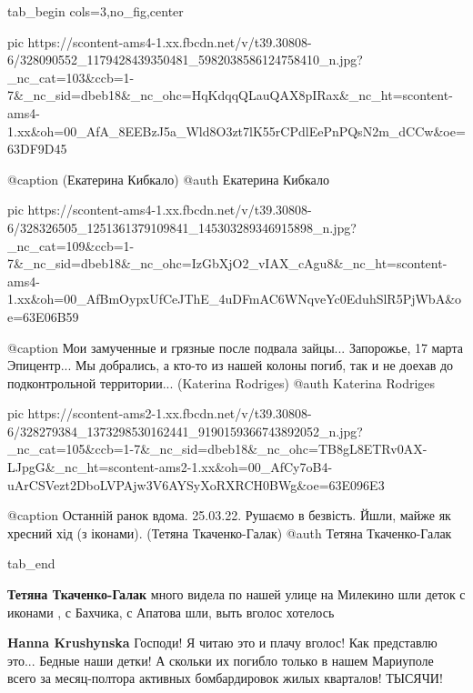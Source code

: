  
 
 
 
 

\ifcmt
  tab_begin cols=3,no_fig,center

     pic https://scontent-ams4-1.xx.fbcdn.net/v/t39.30808-6/328090552_1179428439350481_5982038586124758410_n.jpg?_nc_cat=103&ccb=1-7&_nc_sid=dbeb18&_nc_ohc=HqKdqqQLauQAX8pIRax&_nc_ht=scontent-ams4-1.xx&oh=00_AfA_8EEBzJ5a_Wld8O3zt7lK55rCPdlEePnPQsN2m_dCCw&oe=63DF9D45

     @caption (Екатерина Кибкало)
     @auth Екатерина Кибкало

     pic https://scontent-ams4-1.xx.fbcdn.net/v/t39.30808-6/328326505_1251361379109841_145303289346915898_n.jpg?_nc_cat=109&ccb=1-7&_nc_sid=dbeb18&_nc_ohc=IzGbXjO2_vIAX_cAgu8&_nc_ht=scontent-ams4-1.xx&oh=00_AfBmOypxUfCeJThE_4uDFmAC6WNqveYc0EduhSlR5PjWbA&oe=63E06B59

     @caption Мои замученные и грязные после подвала зайцы... Запорожье, 17 марта Эпицентр... Мы добрались, а кто-то из нашей колоны погиб, так и не доехав до подконтрольной территории... (Katerina Rodriges)
     @auth Katerina Rodriges

     pic https://scontent-ams2-1.xx.fbcdn.net/v/t39.30808-6/328279384_1373298530162441_9190159366743892052_n.jpg?_nc_cat=105&ccb=1-7&_nc_sid=dbeb18&_nc_ohc=TB8gL8ETRv0AX-LJpgG&_nc_ht=scontent-ams2-1.xx&oh=00_AfCy7oB4-uArCSVezt2DboLVPAjw3V6AYSyXoRXRCH0BWg&oe=63E096E3

     @caption Останній ранок вдома. 25.03.22. Рушаємо в безвість. Йшли, майже як хресний хід (з іконами). (Тетяна Ткаченко-Галак)
     @auth Тетяна Ткаченко-Галак

  tab_end
\fi

\textbf{Тетяна Ткаченко-Галак} много видела по нашей улице на Милекино шли деток с иконами , с Бахчика, с Апатова шли, выть вголос хотелось

\textbf{Hanna Krushynska} Господи! Я читаю это и плачу вголос! Как представлю это... Бедные наши детки! А скольки их погибло только в нашем Мариуполе всего за месяц-полтора активных бомбардировок жилых кварталов! ТЫСЯЧИ!

